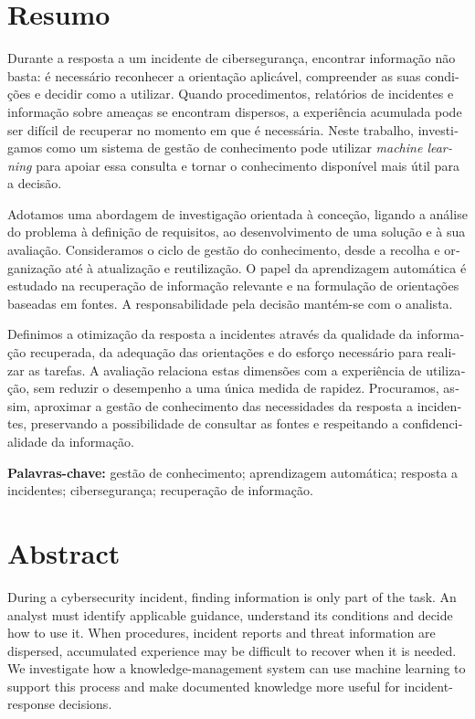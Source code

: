 \chapter*{Resumo}
\begin{otherlanguage}{portuguese}
Durante a resposta a um incidente de cibersegurança, encontrar informação não basta: é necessário reconhecer a orientação aplicável, compreender as suas condições e decidir como a utilizar. Quando procedimentos, relatórios de incidentes e informação sobre ameaças se encontram dispersos, a experiência acumulada pode ser difícil de recuperar no momento em que é necessária. Neste trabalho, investigamos como um sistema de gestão de conhecimento pode utilizar \emph{machine learning} para apoiar essa consulta e tornar o conhecimento disponível mais útil para a decisão.

Adotamos uma abordagem de investigação orientada à conceção, ligando a análise do problema à definição de requisitos, ao desenvolvimento de uma solução e à sua avaliação. Consideramos o ciclo de gestão do conhecimento, desde a recolha e organização até à atualização e reutilização. O papel da aprendizagem automática é estudado na recuperação de informação relevante e na formulação de orientações baseadas em fontes. A responsabilidade pela decisão mantém-se com o analista.

Definimos a otimização da resposta a incidentes através da qualidade da informação recuperada, da adequação das orientações e do esforço necessário para realizar as tarefas. A avaliação relaciona estas dimensões com a experiência de utilização, sem reduzir o desempenho a uma única medida de rapidez. Procuramos, assim, aproximar a gestão de conhecimento das necessidades da resposta a incidentes, preservando a possibilidade de consultar as fontes e respeitando a confidencialidade da informação.

\medskip
\noindent\textbf{Palavras-chave:} gestão de conhecimento; aprendizagem automática; resposta a incidentes; cibersegurança; recuperação de informação.
\end{otherlanguage}

\chapter*{Abstract}
During a cybersecurity incident, finding information is only part of the task. An analyst must identify applicable guidance, understand its conditions and decide how to use it. When procedures, incident reports and threat information are dispersed, accumulated experience may be difficult to recover when it is needed. We investigate how a knowledge-management system can use machine learning to support this process and make documented knowledge more useful for incident-response decisions.

